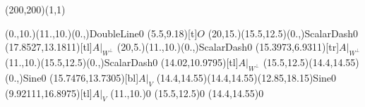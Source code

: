 \unitlength=1bp%

\begin{feynartspicture}(200,200)(1,1)

\FADiagram{}
\FAProp(0.,10.)(11.,10.)(0.,){DoubleLine}{0}
\FALabel(5.5,9.18)[t]{$O$}
\FAProp(20,15.)(15.5,12.5)(0.,){ScalarDash}{0}
\FALabel(17.8527,13.1811)[tl]{$A|_{W^\perp}$}
\FAProp(20,5.)(11.,10.)(0.,){ScalarDash}{0}
\FALabel(15.3973,6.9311)[tr]{$A|_{W^\perp}$}
\FAProp(11.,10.)(15.5,12.5)(0.,){ScalarDash}{0}
\FALabel(14.02,10.9795)[tl]{$A|_{W^\perp}$}
\FAProp(15.5,12.5)(14.4,14.55)(0.,){Sine}{0}
\FALabel(15.7476,13.7305)[bl]{$A|_V$}
\FAProp(14.4,14.55)(14.4,14.55)(12.85,18.15){Sine}{0}
\FALabel(9.92111,16.8975)[tl]{$A|_V$}
\FAVert(11.,10.){0}
\FAVert(15.5,12.5){0}
\FAVert(14.4,14.55){0}
\end{feynartspicture}

